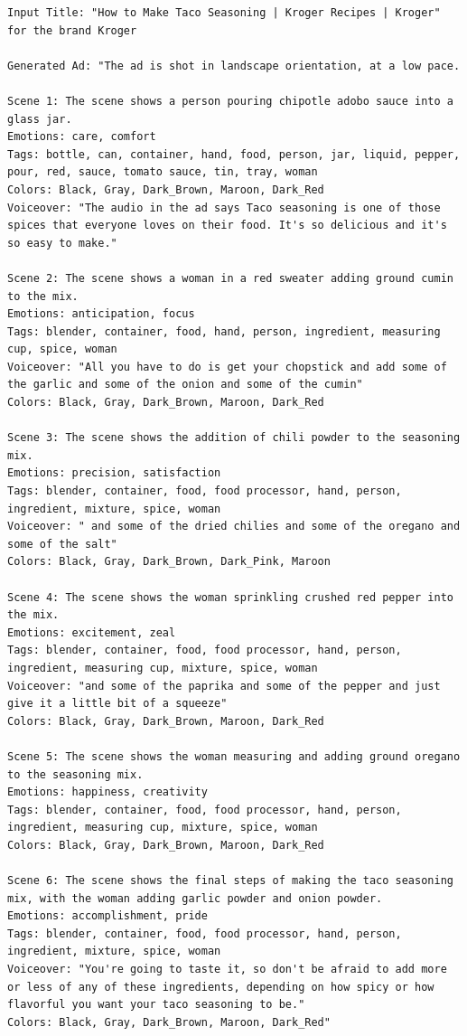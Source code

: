 \begin{lstlisting}[caption={Advertisement generated by Henry-SEED for a Kroger ad. Original Ad: \url{https://www.youtube.com/watch?v=SqwqI01q3fA}},frame=single,breaklines=true,basicstyle=\tiny, label={lst:kroger}]
Input Title: "How to Make Taco Seasoning | Kroger Recipes | Kroger" for the brand Kroger

Generated Ad: "The ad is shot in landscape orientation, at a low pace.  

Scene 1: The scene shows a person pouring chipotle adobo sauce into a glass jar.
Emotions: care, comfort
Tags: bottle, can, container, hand, food, person, jar, liquid, pepper, pour, red, sauce, tomato sauce, tin, tray, woman
Colors: Black, Gray, Dark_Brown, Maroon, Dark_Red
Voiceover: "The audio in the ad says Taco seasoning is one of those spices that everyone loves on their food. It's so delicious and it's so easy to make."

Scene 2: The scene shows a woman in a red sweater adding ground cumin to the mix.
Emotions: anticipation, focus
Tags: blender, container, food, hand, person, ingredient, measuring cup, spice, woman
Voiceover: "All you have to do is get your chopstick and add some of the garlic and some of the onion and some of the cumin"
Colors: Black, Gray, Dark_Brown, Maroon, Dark_Red

Scene 3: The scene shows the addition of chili powder to the seasoning mix.
Emotions: precision, satisfaction
Tags: blender, container, food, food processor, hand, person, ingredient, mixture, spice, woman
Voiceover: " and some of the dried chilies and some of the oregano and some of the salt"
Colors: Black, Gray, Dark_Brown, Dark_Pink, Maroon

Scene 4: The scene shows the woman sprinkling crushed red pepper into the mix.
Emotions: excitement, zeal
Tags: blender, container, food, food processor, hand, person, ingredient, measuring cup, mixture, spice, woman
Voiceover: "and some of the paprika and some of the pepper and just give it a little bit of a squeeze"
Colors: Black, Gray, Dark_Brown, Maroon, Dark_Red

Scene 5: The scene shows the woman measuring and adding ground oregano to the seasoning mix.
Emotions: happiness, creativity
Tags: blender, container, food, food processor, hand, person, ingredient, measuring cup, mixture, spice, woman
Colors: Black, Gray, Dark_Brown, Maroon, Dark_Red

Scene 6: The scene shows the final steps of making the taco seasoning mix, with the woman adding garlic powder and onion powder.
Emotions: accomplishment, pride
Tags: blender, container, food, food processor, hand, person, ingredient, mixture, spice, woman
Voiceover: "You're going to taste it, so don't be afraid to add more or less of any of these ingredients, depending on how spicy or how flavorful you want your taco seasoning to be."
Colors: Black, Gray, Dark_Brown, Maroon, Dark_Red"

\end{lstlisting}


